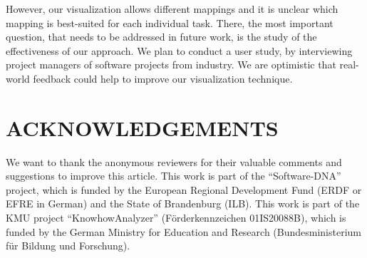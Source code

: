 \documentclass[a4paper,twoside]{article}
\begin{document}
However, our visualization allows different mappings and it is unclear which mapping is best-suited for each individual task.
There, the most important question, that needs to be addressed in future work, is the study of the effectiveness of our approach.
We plan to conduct a user study, by interviewing project managers of software projects from industry.
We are optimistic that real-world feedback could help to improve our visualization technique.

\section*{\uppercase{Acknowledgements}}
\label{sec:acknowledgements}
\noindent
We want to thank the anonymous reviewers for their valuable comments and suggestions to improve this article.
This work is part of the \enquote{Software-DNA} project, which is funded by the European Regional Development Fund (ERDF or EFRE in German) and the State of Brandenburg (ILB).
This work is part of the KMU project \enquote{KnowhowAnalyzer} (Förderkennzeichen 01IS20088B), which is funded by the German Ministry for Education and Research (Bundesministerium für Bildung und Forschung).


{\small
}

\begin{acronym}
\end{acronym}
\end{document}
